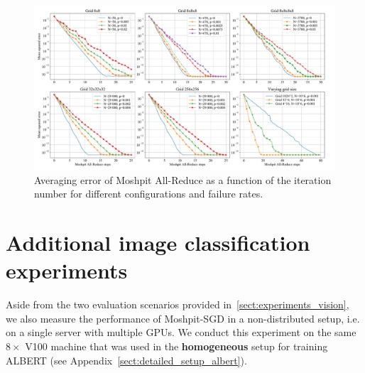 \begin{figure}[h]
    \centering
    \includegraphics[width=\linewidth]{resources/multiple_graphics.pdf}
    \vspace{-20pt}
    \caption{Averaging error of Moshpit All-Reduce as a function of the iteration number for different configurations and failure rates.}
    \label{fig:many_averagings}
\end{figure}

\section{Additional image classification experiments}
\label{sect:extra_classification}

Aside from the two evaluation scenarios provided in~\ref{sect:experiments_vision}, we also measure the performance of Moshpit-SGD in a non-distributed setup, i.e. on a single server with multiple GPUs. We conduct this experiment on the same $8{\times}$ V100 machine that was used in the \textbf{homogeneous} setup for training ALBERT (see Appendix~\ref{sect:detailed_setup_albert}).

